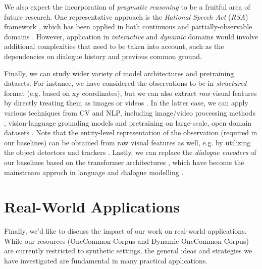 We also expect the incorporation of \textit{pragmatic reasoning} to be a fruitful area of future research. One representative approach is the \textit{Rational Speech Act} (\textit{RSA}) framework \citep{Goodman2016PragmaticLI}, which has been applied in both continuous \citep{monroe2017colors,mcdowell-goodman-2019-learning} and partially-observable domains \citep{Hawkins2021TheDO}. However, application in \textit{interactive} and \textit{dynamic} domains would involve additional complexities that need to be taken into account, such as the dependencies on dialogue history and previous common ground.

Finally, we can study wider variety of model architectures and pretraining datasets. For instance, we have considered the observations to be in \textit{structured} format (e.g. based on xy coordinates), but we can also extract \textit{raw} visual features by directly treating them as images or videos \citep{suhr2017corpus,iki2020language}. In the latter case, we can apply various techniques from CV and NLP, including image/video processing methods \citep{Carreira2017QuoVA,wang2018non,dosovitskiy2021an}, vision-language grounding models \citep{lu2019vilbert,le-etal-2020-bist} and pretraining on large-scale, open domain datasets \citep{krishna2017visual,sharma-etal-2018-conceptual}. Note that the entity-level representation of the observation (required in our baselines) can be obtained from raw visual features as well, e.g. by utilizing the object detectors \citep{NIPS2015_14bfa6bb,redmon2016you} and trackers \citep{tracktor_2019_ICCV,wang2020towards}. Lastly, we can replace the \textit{dialogue encoders} of our baselines based on the transformer architectures \citep{NIPS2017_3f5ee243}, which have become the mainstream approch in language and dialogue modelling \citep{devlin-etal-2019-bert,lewis-etal-2020-bart,zhang-etal-2020-dialogpt}.


\section{Real-World Applications}
\label{07_sec:real_world_applications}

Finally, we'd like to discuss the impact of our work on real-world applications. While our resources (OneCommon Corpus and Dynamic-OneCommon Corpus) are currently restricted to synthetic settings, the general ideas and strategies we have investigated are fundamental in many practical applications.

